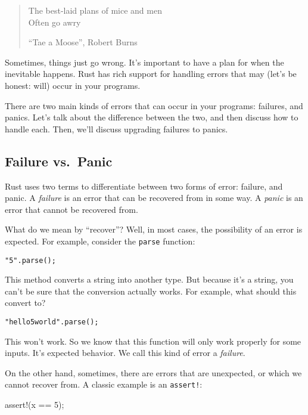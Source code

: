 \documentclass[a4paper,]{book}
\newenvironment{Shaded}{\begin{snugshade}}{\end{snugshade}}
\newcommand{\DecValTok}[1]{\textcolor[rgb]{0.00,0.00,0.81}{{#1}}}
\newcommand{\OtherTok}[1]{\textcolor[rgb]{0.56,0.35,0.01}{{#1}}}
\newcommand{\NormalTok}[1]{{#1}}
\begin{document}
\begin{quote}
The best-laid plans of mice and men\\Often go awry

``Tae a Moose'', Robert Burns
\end{quote}

Sometimes, things just go wrong. It's important to have a plan for when
the inevitable happens. Rust has rich support for handling errors that
may (let's be honest: will) occur in your programs.

There are two main kinds of errors that can occur in your programs:
failures, and panics. Let's talk about the difference between the two,
and then discuss how to handle each. Then, we'll discuss upgrading
failures to panics.

\subsection{Failure vs.~Panic}\label{failure-vs.panic}

Rust uses two terms to differentiate between two forms of error:
failure, and panic. A \emph{failure} is an error that can be recovered
from in some way. A \emph{panic} is an error that cannot be recovered
from.

What do we mean by ``recover''? Well, in most cases, the possibility of
an error is expected. For example, consider the \texttt{parse} function:

\begin{verbatim}
"5".parse();
\end{verbatim}

This method converts a string into another type. But because it's a
string, you can't be sure that the conversion actually works. For
example, what should this convert to?

\begin{verbatim}
"hello5world".parse();
\end{verbatim}

This won't work. So we know that this function will only work properly
for some inputs. It's expected behavior. We call this kind of error a
\emph{failure}.

On the other hand, sometimes, there are errors that are unexpected, or
which we cannot recover from. A classic example is an \texttt{assert!}:

\begin{Shaded}
\begin{Highlighting}[]
\OtherTok{assert!}\NormalTok{(x == }\DecValTok{5}\NormalTok{);}
\end{Highlighting}
\end{Shaded}
\end{document}
